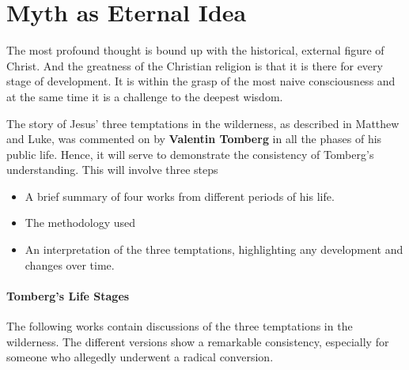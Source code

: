 \section{Myth as Eternal Idea}

\begin{quotex}
The most profound thought is bound up with the historical, external figure of Christ. And the greatness of the Christian religion is that it is there for every stage of development. It is within the grasp of the most naive consciousness and at the same time it is a challenge to the deepest wisdom. 

\end{quotex}
The story of Jesus' three temptations in the wilderness, as described in Matthew and Luke, was commented on by \textbf{Valentin Tomberg} in all the phases of his public life. Hence, it will serve to demonstrate the consistency of Tomberg's understanding. This will involve three steps

\begin{itemize}
\item A brief summary of four works from different periods of his life. 
\item The methodology used 
\item An interpretation of the three temptations, highlighting any development and changes over time. 
\end{itemize}
\paragraph{Tomberg's Life Stages}
The following works contain discussions of the three temptations in the wilderness. The different versions show a remarkable consistency, especially for someone who allegedly underwent a radical conversion.

